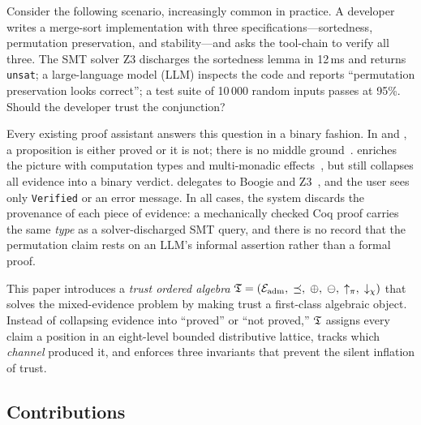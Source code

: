 \documentclass[11pt]{article}
\begin{document}
Consider the following scenario, increasingly common in
practice.  A developer writes a merge-sort implementation
with three specifications---sortedness, permutation preservation,
and stability---and asks the tool-chain to verify all three.
The SMT solver Z3 discharges the sortedness lemma in 12\,ms
and returns \texttt{unsat}; a large-language model (LLM)
inspects the code and reports ``permutation preservation looks
correct''; a test suite of 10\,000 random inputs passes
at 95\%.  Should the developer trust the conjunction?

Every existing proof assistant answers this question in
a binary fashion.  In \LEAN{} and \Coq{}, a proposition
is either proved or it is not; there is no middle
ground~\cite{lean4,coq}.  \Fstar{} enriches the picture
with computation types and multi-monadic effects~\cite{fstar},
but still collapses all evidence into a binary verdict.
\Dafny{} delegates to Boogie and Z3~\cite{dafny}, and the
user sees only \texttt{Verified} or an error message.
In all cases, the system discards the provenance of each
piece of evidence: a mechanically checked Coq proof carries
the same \emph{type} as a solver-discharged SMT query, and
there is no record that the permutation claim rests on an
LLM's informal assertion rather than a formal proof.

This paper introduces a \emph{trust ordered algebra}
$\mathfrak{T} = (\mathcal{E}_{\mathrm{adm}},\;\preceq,\;\oplus,\;\ominus,\;\uparrow_\pi,\;\downarrow_\chi)$
that solves the mixed-evidence problem by making trust
a first-class algebraic object.  Instead of collapsing
evidence into ``proved'' or ``not proved,'' $\mathfrak{T}$ assigns
every claim a position in an eight-level bounded distributive
lattice, tracks which \emph{channel} produced it, and enforces
three invariants that prevent the silent inflation of trust.

\subsection{Contributions}
\end{document}
